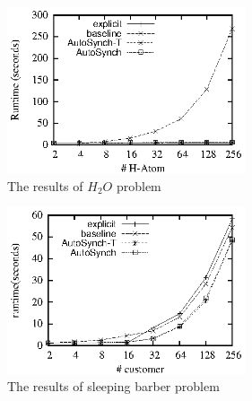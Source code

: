 \documentclass{sigplanconf}
\begin{document}
\begin{figure}[ht!]
  \centering
  \includegraphics[width=70mm]{fig/h2o.eps}
  \caption{The results of $H_2O$ problem}
  \label{fig:h2o_eval}
\end{figure}

\begin{figure}[ht!]
  \centering
  \includegraphics[width=70mm]{fig/sb.eps}
  \caption{The results of sleeping barber problem}
  \label{fig:sb_eval}
\end{figure}
\end{document}
